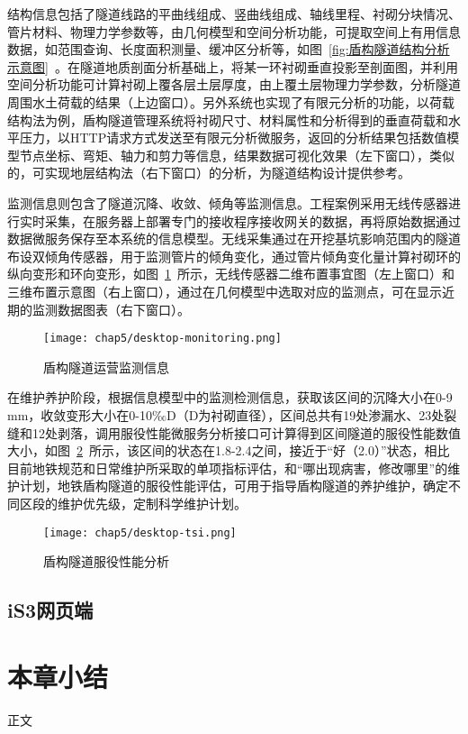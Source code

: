结构信息包括了隧道线路的平曲线组成、竖曲线组成、轴线里程、衬砌分块情况、管片材料、物理力学参数等，由几何模型和空间分析功能，可提取空间上有用信息数据，如范围查询、长度面积测量、缓冲区分析等，如图~\ref{fig:盾构隧道结构分析示意图}~。在隧道地质剖面分析基础上，将某一环衬砌垂直投影至剖面图，并利用空间分析功能可计算衬砌上覆各层土层厚度，由上覆土层物理力学参数，分析隧道周围水土荷载的结果（上边窗口）。另外系统也实现了有限元分析的功能，以荷载结构法为例，盾构隧道管理系统将衬砌尺寸、材料属性和分析得到的垂直荷载和水平压力，以HTTP请求方式发送至有限元分析微服务，返回的分析结果包括数值模型节点坐标、弯矩、轴力和剪力等信息，结果数据可视化效果（左下窗口），类似的，可实现地层结构法（右下窗口）的分析，为隧道结构设计提供参考。

监测信息则包含了隧道沉降、收敛、倾角等监测信息。工程案例采用无线传感器进行实时采集，在服务器上部署专门的接收程序接收网关的数据，再将原始数据通过数据微服务保存至本系统的信息模型。无线采集通过在开挖基坑影响范围内的隧道布设双倾角传感器，用于监测管片的倾角变化，通过管片倾角变化量计算衬砌环的纵向变形和环向变形，如图~\ref{fig:盾构隧道运营监测信息}~所示，无线传感器二维布置事宜图（左上窗口）和三维布置示意图（右上窗口），通过在几何模型中选取对应的监测点，可在显示近期的监测数据图表（右下窗口）。

\begin{figure}[htb!]
    \centering
    \texttt{[image: chap5/desktop-monitoring.png]}
    \caption{盾构隧道运营监测信息}
    \label{fig:盾构隧道运营监测信息}
\end{figure}

在维护养护阶段，根据信息模型中的监测检测信息，获取该区间的沉降大小在0-9 mm，收敛变形大小在0-10‰D（D为衬砌直径），区间总共有19处渗漏水、23处裂缝和12处剥落，调用服役性能微服务分析接口可计算得到区间隧道的服役性能数值大小，如图~\ref{fig:盾构隧道服役性能分析}~所示，该区间的状态在1.8-2.4之间，接近于“好（2.0）”状态，相比目前地铁规范和日常维护所采取的单项指标评估，和“哪出现病害，修改哪里”的维护计划，地铁盾构隧道的服役性能评估，可用于指导盾构隧道的养护维护，确定不同区段的维护优先级，定制科学维护计划。

\begin{figure}[htb!]
    \centering
    \texttt{[image: chap5/desktop-tsi.png]}
    \caption{盾构隧道服役性能分析}
    \label{fig:盾构隧道服役性能分析}
\end{figure}


\subsection{iS3网页端}


\section{本章小结}

正文